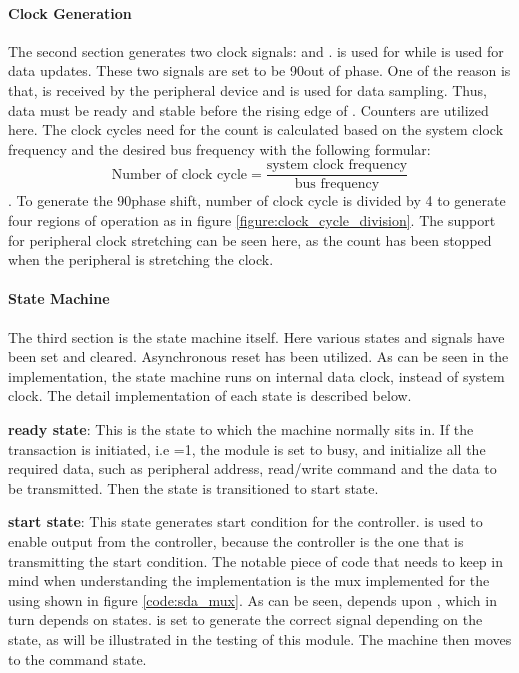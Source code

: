 \paragraph*{Clock Generation}
The second section generates two clock signals:  and .  is used for  while  is used for data updates. These two signals are set to be 90\textdegree out of phase. One of the reason is that,  is received by the peripheral device and is used for data sampling. Thus, data must be ready and stable before the rising edge of . Counters are utilized here. The clock cycles need for the count is calculated based on the system clock frequency and the desired bus frequency with the following formular: $$\text{Number of clock cycle} = \frac{\text{system clock frequency}}{\text{bus frequency}}$$. To generate the 90\textdegree phase shift, number of clock cycle is divided by 4 to generate four regions of operation as in figure \ref{figure:clock_cycle_division}. The support for peripheral clock stretching can be seen here, as the count has been stopped when the peripheral is stretching the clock. 


\newpage
\paragraph*{State Machine}
The third section is the state machine itself. Here various states and signals have been set and cleared. Asynchronous reset has been utilized. As can be seen in the implementation, the state machine runs on internal data clock, instead of system clock. The detail implementation of each state is described below.

\textbf{ready state}: This is the state to which the machine normally sits in. If the transaction is initiated, i.e =1, the module is set to busy, and initialize all the required data, such as peripheral address, read/write command and the data to be transmitted. Then the state is transitioned to start state.

\textbf{start state}: This state generates start condition for the controller.  is used to enable  output from the controller, because the controller is the one that is transmitting the start condition. The notable piece of code that needs to keep in mind when understanding the implementation is the mux implemented for the  using  shown in figure \ref{code:sda_mux}. As can be seen,  depends upon , which in turn depends on states.  is set to generate the correct signal depending on the state, as will be illustrated in the testing of this module. The machine then moves to the command state.

